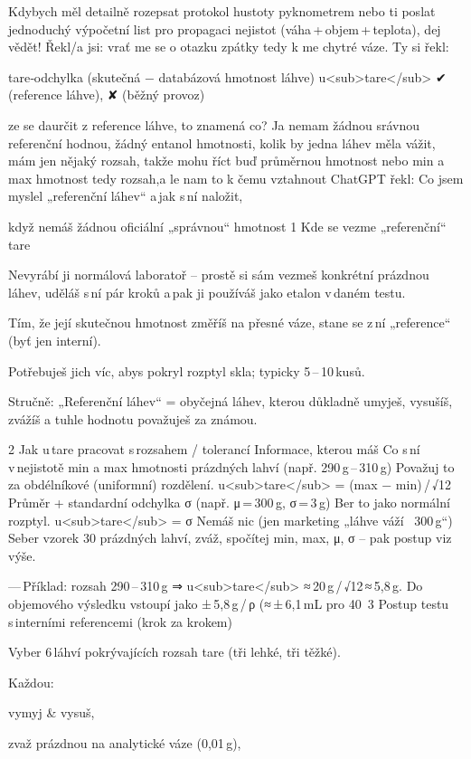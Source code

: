 Kdybych měl detailně rozepsat protokol hustoty pyknometrem nebo ti poslat jednoduchý výpočetní list pro propagaci nejistot (váha + objem + teplota), dej vědět!
Řekl/a jsi:
vrať me se o otazku zpátky tedy k me chytré váze. Ty si řekl:

tare‑odchylka (skutečná − databázová hmotnost láhve)	u<sub>tare</sub>	✔ (reference láhve), ✘ (běžný provoz)

ze se daurčit z reference láhve, to znamená co? Ja nemam žádnou srávnou referenční hodnou, žádný entanol hmotnosti, kolik by jedna láhev měla vážit, mám jen nějaký rozsah, takže mohu říct buď průměrnou hmotnost nebo min a max hmotnost tedy rozsah,a le nam to k čemu vztahnout
ChatGPT řekl:
Co jsem myslel „referenční láhev“ a jak s ní naložit,

když nemáš žádnou oficiální „správnou“ hmotnost
1  Kde se vezme „referenční“ tare

    Nevyrábí ji normálová laboratoř – prostě si sám vezmeš konkrétní prázdnou láhev, uděláš s ní pár kroků a pak ji používáš jako etalon v daném testu.

    Tím, že její skutečnou hmotnost změříš na přesné váze, stane se z ní „reference“ (byť jen interní).

    Potřebuješ jich víc, abys pokryl rozptyl skla; typicky 5 – 10 kusů.

    Stručně: „Referenční láhev“ = obyčejná láhev, kterou důkladně umyješ, vysušíš, zvážíš a tuhle hodnotu považuješ za známou.

2  Jak u tare pracovat s rozsahem / tolerancí
Informace, kterou máš	Co s ní v nejistotě
min a max hmotnosti prázdných lahví (např. 290 g – 310 g)	Považuj to za obdélníkové (uniformní) rozdělení. 
u<sub>tare</sub> = (max − min) / √12
Průměr + standardní odchylka σ (např. μ = 300 g, σ = 3 g)	Ber to jako normální rozptyl. 
u<sub>tare</sub> = σ
Nemáš nic (jen marketing „láhve váží ~300 g“)	Seber vzorek 30 prázdných lahví, zváž, spočítej min, max, μ, σ – pak postup viz výše.

— Příklad: rozsah 290 – 310 g ⇒ u<sub>tare</sub> ≈ 20 g / √12 ≈ 5,8 g.
Do objemového výsledku vstoupí jako ± 5,8 g / ρ (≈ ± 6,1 mL pro 40 %
3  Postup testu s interními referencemi (krok za krokem)

    Vyber 6 láhví pokrývajících rozsah tare (tři lehké, tři těžké).

    Každou:

        vymyj & vysuš,

        zvaž prázdnou na analytické váze (0,01 g),

